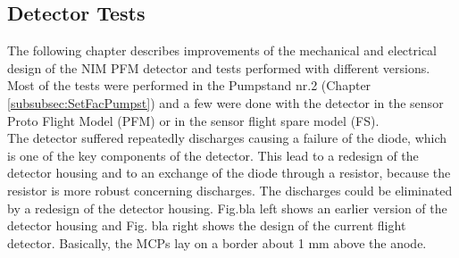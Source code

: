 	\subsection{Detector Tests}
	The following chapter describes improvements of the mechanical and electrical design of the NIM PFM detector and tests performed with different versions. Most of the tests were performed in the Pumpstand nr.2 (Chapter \ref{subsubsec:SetFacPumpst}) and a few were done with the detector in the sensor Proto Flight Model (PFM) or in the sensor flight spare model (FS).\\
	The detector suffered repeatedly discharges causing a failure of the diode, which is one of the key components of the detector. This lead to a redesign of the detector housing and to an exchange of the diode through a resistor, because the resistor is more robust concerning discharges. %
	The discharges could be eliminated by a redesign of the detector housing. %
	Fig.bla left shows an earlier version of the detector housing and Fig. bla right shows the design of the current flight detector.
	Basically, the MCPs lay on a border about 1 mm above the anode. %
